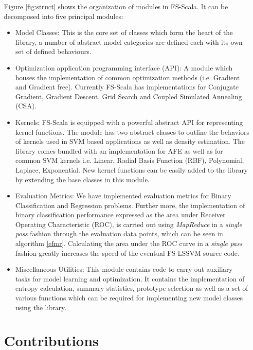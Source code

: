Figure \ref{fig:struct} shows the organization of modules in FS-Scala. It can be decomposed into five principal modules:
\begin{itemize}
\item Model Classes:
This is the core set of classes which form the heart of the library, a number of abstract model categories are defined each with its own set of defined behaviours. 
\item Optimization application programming interface (API):
A module which houses the implementation of common optimization methods (i.e. Gradient and Gradient free). Currently FS-Scala has implementations for Conjugate Gradient, Gradient Descent, Grid Search and Coupled Simulated Annealing \cite{Xavier-De-Souza2010} (CSA). 
\item Kernels:
FS-Scala is equipped with a powerful abstract API for representing kernel functions. The module has two abstract classes to outline the behaviors of kernels used in SVM based applications as well as density estimation. The library comes bundled with an implementation for AFE as well as for common SVM kernels i.e. Linear, Radial Basis Function (RBF), Polynomial, Laplace, Exponential. New kernel functions can be easily added to the library by extending the base classes in this module.
\item Evaluation Metrics:
We have implemented evaluation metrics for Binary Classification and Regression problems. Further more, the implementation of binary classification performance expressed as the area under Receiver Operating Characteristic (ROC), is carried out using \textit{MapReduce} in a \textit{single pass} fashion through the evaluation data points, which can be seen in algorithm \ref{efmr}. Calculating the area under the ROC curve in a \textit{single pass} fashion greatly increases the speed of the eventual FS-LSSVM source code.
\item Miscellaneous Utilities:
This module contains code to carry out auxiliary tasks for model learning and optimization. It contains the implementation of entropy calculation, summary statistics, prototype selection as well as a set of various functions which can be required for implementing new model classes using the library.  

\end{itemize}

\section{Contributions}
\label{contributions}

